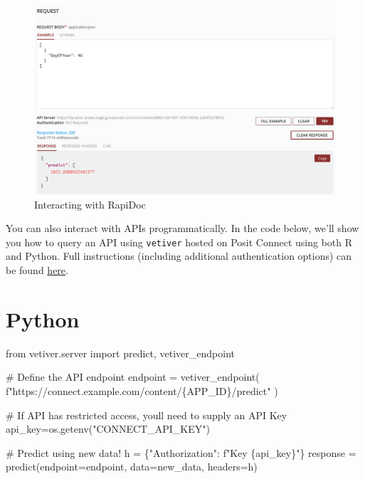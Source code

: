 \documentclass[
  letterpaper,
  DIV=11,
  numbers=noendperiod]{scrreprt}
\newenvironment{Shaded}{\begin{snugshade}}{\end{snugshade}}
\newcommand{\CommentTok}[1]{\textcolor[rgb]{0.37,0.37,0.37}{#1}}
\newcommand{\ImportTok}[1]{\textcolor[rgb]{0.00,0.46,0.62}{#1}}
\newcommand{\NormalTok}[1]{\textcolor[rgb]{0.00,0.23,0.31}{#1}}
\newcommand{\OperatorTok}[1]{\textcolor[rgb]{0.37,0.37,0.37}{#1}}
\newcommand{\SpecialCharTok}[1]{\textcolor[rgb]{0.37,0.37,0.37}{#1}}
\newcommand{\SpecialStringTok}[1]{\textcolor[rgb]{0.13,0.47,0.30}{#1}}
\newcommand{\StringTok}[1]{\textcolor[rgb]{0.13,0.47,0.30}{#1}}
\begin{document}
\begin{figure}

{\centering \includegraphics{images/rapidoc-response.png}

}

\caption{Interacting with RapiDoc}

\end{figure}%

You can also interact with APIs programmatically. In the code below,
we'll show you how to query an API using \texttt{vetiver} hosted on
Posit Connect using both R and Python. Full instructions (including
additional authentication options) can be found
\href{https://docs.posit.co/connect/user/vetiver/}{here}.

\section{Python}

\begin{Shaded}
\begin{Highlighting}[]
\ImportTok{from}\NormalTok{ vetiver.server }\ImportTok{import}\NormalTok{ predict, vetiver\_endpoint}

\CommentTok{\# Define the API endpoint}
\NormalTok{endpoint }\OperatorTok{=}\NormalTok{ vetiver\_endpoint(}
    \SpecialStringTok{f"https://connect.example.com/content/}\SpecialCharTok{\{}\NormalTok{APP\_ID}\SpecialCharTok{\}}\SpecialStringTok{/predict"}
\NormalTok{)}

\CommentTok{\# If API has restricted access, you\textquotesingle{}ll need to supply an API Key}
\NormalTok{api\_key}\OperatorTok{=}\NormalTok{os.getenv(}\StringTok{"CONNECT\_API\_KEY"}\NormalTok{)}

\CommentTok{\# Predict using new data!}
\NormalTok{h }\OperatorTok{=}\NormalTok{ \{}\StringTok{"Authorization"}\NormalTok{: }\SpecialStringTok{f"Key }\SpecialCharTok{\{}\NormalTok{api\_key}\SpecialCharTok{\}}\SpecialStringTok{"}\NormalTok{\}}
\NormalTok{response }\OperatorTok{=}\NormalTok{ predict(endpoint}\OperatorTok{=}\NormalTok{endpoint, data}\OperatorTok{=}\NormalTok{new\_data, headers}\OperatorTok{=}\NormalTok{h)}
\end{Highlighting}
\end{Shaded}
\end{document}
